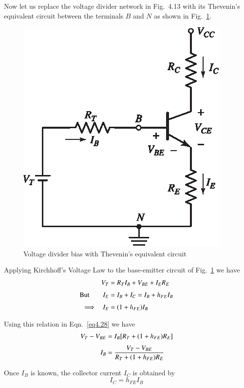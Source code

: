Now let us replace the voltage divider network in Fig.~4.13 with its Thevenin's equivalent circuit between the terminals $B$ and $N$ as shown in Fig.~\ref{fig4.17}.
\begin{figure}[H]
\centering
\includegraphics{chap3/S3-EE-03-050.eps}
\caption{Voltage divider bias with Thevenin's equivalent circuit}\label{fig4.17}
\end{figure}

Applying Kirchhoff's Voltage Law to the base-emitter circuit of Fig.~\ref{fig4.17} we have
\begin{align}
V_{T} &= R_{T}I_{B}+V_{BE}+I_{E}R_{E}\label{eq4.28}\\[3pt]
\text{But}\qquad I_{E} &= I_{B}+I_{C}=I_{B}+h_{FE}I_{B}\notag\\[3pt]
\Longrightarrow\quad I_{E} &= (1+h_{FE})I_{B}\notag
\end{align}

Using this relation in Eqn.~\eqref{eq4.28} we have
\begin{align}
V_{T}-V_{BE} &= I_{B}[R_{T}+(1+h_{FE})R_{E}]\notag\\[3pt]
I_{B} &= \frac{V_{T}-V_{BE}}{R_{T}+(1+h_{FE})R_{E}}\label{eq4.29}
\end{align}

Once $I_{B}$ is known, the collector current $I_{C}$ is obtained by
\begin{equation}
I_{C}=h_{FE}I_{B}\label{eq4.30}
\end{equation}

